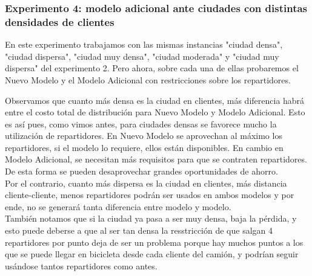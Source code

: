 \documentclass{article}
\begin{document}
    \subsubsection{Experimento 4: modelo adicional ante ciudades con distintas densidades de clientes}

    En este experimento trabajamos con las mismas instancias "ciudad densa", "ciudad dispersa", "ciudad muy densa", "ciudad moderada" y "ciudad muy dispersa" del experimento 2. Pero ahora, sobre cada una de ellas probaremos el Nuevo Modelo y el Modelo Adicional con restricciones sobre los repartidores.

    \begin{table}[H]
    \centering
    \caption{Comparación de costos entre metodologías para distintas densidades de clientes por $km^{2}$}
    \end{table}

    Observamos que cuanto más densa es la ciudad en clientes, más diferencia habrá entre el costo total de distribución para Nuevo Modelo y Modelo Adicional. Esto es así pues, como vimos antes, para ciudades densas se favorece mucho la utilización de repartidores. En Nuevo Modelo se aprovechan al máximo los repartidores, si el modelo lo requiere, ellos están disponibles. En cambio en Modelo Adicional, se necesitan más requisitos para que se contraten repartidores. De esta forma se pueden desaprovechar grandes oportunidades de ahorro. \\
    Por el contrario, cuanto más dispersa es la ciudad en clientes, más distancia cliente-cliente, menos repartidores podrán ser usados en ambos modelos y por ende, no se generará tanta diferencia entre modelo y modelo. \\
    También notamos que si la ciudad ya pasa a ser muy densa, baja la pérdida, y esto puede deberse a que al ser tan densa la resstricción de que salgan 4 repartidores por punto deja de ser un problema porque hay muchos puntos a los que se puede llegar en bicicleta desde cada cliente del camión, y podrían seguir usándose tantos repartidores como antes.
\end{document}
